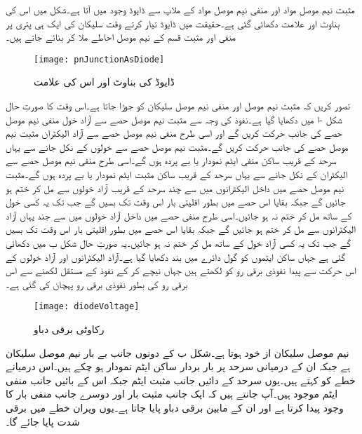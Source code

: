 	مثبت نیم موصل مواد اور منفی نیم موصل مواد کے ملاپ سے ڈایوڈ   وجود میں آتا ہے۔شکل   میں اس کی بناوٹ اور علامت دکھائی گئی ہے۔حقیقت میں ڈایوڈ تیار کرتے وقت سلیکان کی ایک ہی پتری پر منفی اور مثبت  قسم کے نیم موصل احاطے ملا کر بنائے جاتے ہیں۔
\begin{figure}
\centering
\texttt{[image: pnJunctionAsDiode]}
\caption{ڈایوڈ کی بناوٹ اور اس کی علامت}
\label{شکل_ڈایوڈ_کی_بناوٹ}
\end{figure}
	تصور کریں کہ مثبت نیم موصل اور منفی نیم موصل سلیکان کو جوڑا جاتا ہے۔اس وقت کا صورتِ حال شکل -ا میں دکھایا گیا ہے۔نفوذ کی وجہ سے مثبت نیم موصل حصے سے آزاد خول منفی نیم موصل حصے کی جانب حرکت کریں گے اور اسی طرح منفی نیم موصل حصے سے آزاد الیکٹران مثبت نیم موصل حصے کی جانب حرکت کریں گے۔مثبت نیم موصل حصے سے خولوں کے نکل جانے سے یہاں سرحد کے قریب ساکن منفی ایٹم نمودار یا بے پردہ  ہوں گے۔اسی طرح منفی نیم موصل حصے سے الیکٹران کے نکل جانے سے یہاں سرحد کے قریب ساکن مثبت ایٹم نمودار یا بے پردہ ہوں گے۔مثبت نیم موصل حصے میں داخل الیکٹرانوں میں سے چند سرحد کے قریب آزاد خولوں سے مل کر ختم ہو جائیں گے جبکہ بقایا اس حصے میں بطور اقلیتی بار اس وقت تک بسیں گے جب تک یہ کسی خول کے ساتھ مل کر ختم نہ ہو جائیں۔اسی طرح منفی حصے میں داخل آزاد خولوں میں سے جند یہاں آزاد الیکٹرانوں سے مل کر ختم ہو جائیں گے جبکہ بقایا اس حصے میں بطور اقلیتی بار اس وقت تک بسیں گے جب تک یہ کسی آزاد خول کے ساتھ مل کر ختم نہ ہو جائیں۔یہ صورتِ حال شکل  ب میں دکھائی گئی ہے جہاں ساکن ایٹموں کو گول دائرے میں بند دکھایا گیا ہے۔آزاد الیکٹرانوں اور آزاد خولوں کے اس حرکت سے پیدا نفوذی برقی رو کو  لکھتے ہیں جہاں نیچے کر کے نفوذ کے مستقل  لکھنے سے اس برقی رو کی بطور نفوذی برقی رو پہچان کی گئی ہے۔
\begin{figure}
\centering
\texttt{[image: diodeVoltage]}
\caption{رکاوٹی برقی دباو}
\label{شکل_رکاوٹی_برقی_دباو}
\end{figure}
نیم موصل سلیکان از خود  ہوتا ہے۔شکل  ب کے دونوں جانب بے بار  نیم موصل سلیکان ہے جبکہ ان کے درمیانی سرحد پر بار بردار ساکن ایٹم نمودار ہو چکے ہیں۔اس درمیانے خطے کو  کہتے ہیں۔یوں سرحد کے دائیں جانب مثبت ایٹم جبکہ اس کے بائیں جانب منفی ایٹم موجود ہیں۔آپ جانتے ہیں کہ ایک جانب مثبت بار اور دوسرے جانب منفی بار کا وجود    پیدا کرتا ہے اور ان  کے مابین برقی دباو   پایا جاتا ہے۔یوں ویران خطے میں برقی شدت  پایا جائے گا۔

